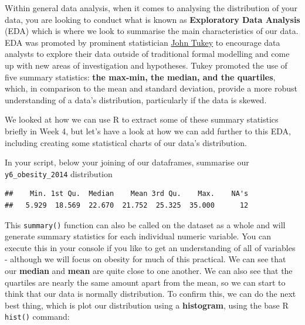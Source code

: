 \documentclass[
]{book}
\newenvironment{Shaded}{\begin{snugshade}}{\end{snugshade}}
\newcommand{\CommentTok}[1]{\textcolor[rgb]{0.56,0.35,0.01}{\textit{#1}}}
\newcommand{\FunctionTok}[1]{\textcolor[rgb]{0.00,0.00,0.00}{#1}}
\newcommand{\NormalTok}[1]{#1}
\newcommand{\SpecialCharTok}[1]{\textcolor[rgb]{0.00,0.00,0.00}{#1}}
\begin{document}
Within general data analysis, when it comes to analysing the distribution of your data, you are looking to conduct what is known as \textbf{Exploratory Data Analysis} (EDA) which is where we look to summarise the main characteristics of our data. EDA was promoted by prominent statistician \href{https://en.wikipedia.org/wiki/John_Tukey}{John Tukey} to encourage data analysts to explore their data outside of traditional formal modelling and come up with new areas of investigation and hypotheses. Tukey promoted the use of five summary statistics: \textbf{the max-min, the median, and the quartiles}, which, in comparison to the mean and standard deviation, provide a more robust understanding of a data's distribution, particularly if the data is skewed.

We looked at how we can use R to extract some of these summary statistics briefly in Week 4, but let's have a look at how we can add further to this EDA, including creating some statistical charts of our data's distribution.

In your script, below your joining of our dataframes, summarise our \texttt{y6\_obesity\_2014} distribution

\begin{Shaded}
\end{Shaded}

\begin{verbatim}
##    Min. 1st Qu.  Median    Mean 3rd Qu.    Max.    NA's 
##   5.929  18.569  22.670  21.752  25.325  35.000      12
\end{verbatim}

This \texttt{summary()} function can also be called on the dataset as a whole and will generate summary statistics for each individual numeric variable. You can execute this in your console if you like to get an understanding of all of variables - although we will focus on obesity for much of this practical. We can see that our \textbf{median} and \textbf{mean} are quite close to one another. We can also see that the quartiles are nearly the same amount apart from the mean, so we can start to think that our data is normally distribution. To confirm this, we can do the next best thing, which is plot our distribution using a \textbf{histogram}, using the base R \texttt{hist()} command:
\end{document}
